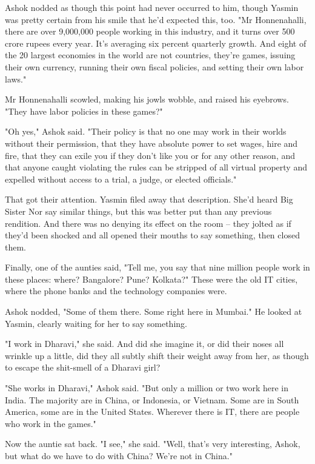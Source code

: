 Ashok nodded as though this point had never occurred to him, though
Yasmin was pretty certain from his smile that he'd expected this,
too. "Mr Honnenahalli, there are over 9,000,000 people working in
this industry, and it turns over 500 crore rupees every year. It's
averaging six percent quarterly growth. And eight of the 20 largest
economies in the world are not countries, they're games, issuing
their own currency, running their own fiscal policies, and setting
their own labor laws."

Mr Honnenahalli scowled, making his jowls wobble, and raised his
eyebrows. "They have labor policies in these games?"

"Oh yes," Ashok said. "Their policy is that no one may work in
their worlds without their permission, that they have absolute
power to set wages, hire and fire, that they can exile you if they
don't like you or for any other reason, and that anyone caught
violating the rules can be stripped of all virtual property and
expelled without access to a trial, a judge, or elected
officials."

That got their attention. Yasmin filed away that description. She'd
heard Big Sister Nor say similar things, but this was better put
than any previous rendition. And there was no denying its effect on
the room -- they jolted as if they'd been shocked and all opened
their mouths to say something, then closed them.

Finally, one of the aunties said, "Tell me, you say that nine
million people work in these places: where? Bangalore? Pune?
Kolkata?" These were the old IT cities, where the phone banks and
the technology companies were.

Ashok nodded, "Some of them there. Some right here in Mumbai." He
looked at Yasmin, clearly waiting for her to say something.

"I work in Dharavi," she said. And did she imagine it, or did their
noses all wrinkle up a little, did they all subtly shift their
weight away from her, as though to escape the shit-smell of a
Dharavi girl?

"She works in Dharavi," Ashok said. "But only a million or two work
here in India. The majority are in China, or Indonesia, or Vietnam.
Some are in South America, some are in the United States. Wherever
there is IT, there are people who work in the games."

Now the auntie sat back. "I see," she said. "Well, that's very
interesting, Ashok, but what do we have to do with China? We're not
in China."

